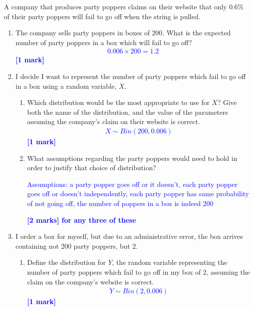 \documentclass[11pt,a4paper]{article}
\begin{document}
\begin{question}
A company that produces party poppers claims on their website that only 0.6\% of their party poppers will fail to go off when the string is pulled.
\begin{enumerate}
\item The company sells party poppers in boxes of 200. What is the expected number of party poppers in a box which will fail to go off?
\textcolor{blue}{
\begin{eqnarray*}
0.006\times 200=1.2
\end{eqnarray*}
}
\textcolor{blue}{\textbf{[1 mark]}}

\item I decide I want to represent the number of party poppers which fail to go off in a box using a random variable, $X$.
\begin{enumerate}
\item Which distribution would be the most appropriate to use for $X$? Give both the name of the distribution, and the value of the parameters assuming the company's claim on their website is correct.
\textcolor{blue}{
\begin{eqnarray*}
X\sim Bin(200,0.006)
\end{eqnarray*}
}
\textcolor{blue}{\textbf{[1 mark]}}
\item What assumptions regarding the party poppers would need to hold in order to justify that choice of distribution?

\textcolor{blue}{
Assumptions: a party popper goes off or it doesn't, each party popper goes off or doesn't independently, each party popper has same probability of not going off, the number of poppers in a box is indeed 200
}

\textcolor{blue}{\textbf{[2 marks] for any three of these}}


\end{enumerate}
\item I order a box for myself, but due to an administrative error, the box arrives containing not 200 party poppers, but 2.
\begin{enumerate}
\item Define the distribution for $Y$, the random variable representing the number of party poppers which fail to go off in my box of 2, assuming the claim on the company's website is correct.
\textcolor{blue}{
\begin{eqnarray*}
Y\sim Bin(2,0.006)
\end{eqnarray*}
}
\textcolor{blue}{\textbf{[1 mark]}}


\end{enumerate}
\end{enumerate}
\end{question}
\end{document}
